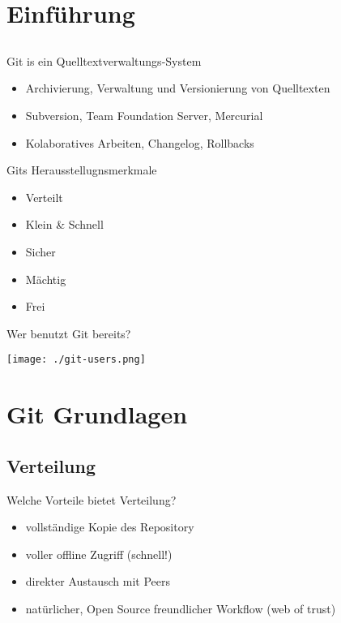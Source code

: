 

\frame{
    \titlepage
}

\section{Einführung}
\subsection{}

\begin{frame}{Git is ein Quelltextverwaltungs-System}
    \begin{itemize}[<+->]
        \item Archivierung, Verwaltung und Versionierung von Quelltexten
        \item Subversion, Team Foundation Server, Mercurial
        \item Kolaboratives Arbeiten, Changelog, Rollbacks
    \end{itemize}
\end{frame}

\begin{frame}{Gits Herausstellugnsmerkmale}
    \begin{itemize}[<+->]
        \item \alert<6>{Verteilt}
        \item Klein \& Schnell
        \item \alert<6>{Sicher}
        \item \alert<6>{Mächtig}
        \item Frei
    \end{itemize}
\end{frame}

\begin{frame}{Wer benutzt Git bereits?}
    \centerline{\texttt{[image: ./git-users.png]}}
\end{frame}

\section{Git Grundlagen}

\subsection{Verteilung}

\begin{frame}{Welche Vorteile bietet Verteilung?}
    \begin{itemize}[<+->]
        \item vollständige Kopie des Repository
        \item voller offline Zugriff (schnell!)
        \item direkter Austausch mit Peers
        \item natürlicher, Open Source freundlicher Workflow (web of trust)
    \end{itemize}
\end{frame}


